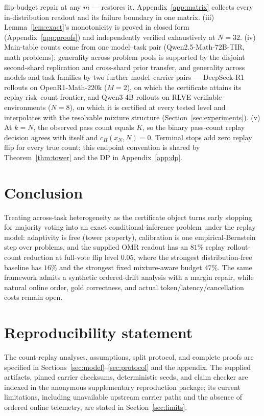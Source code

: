 \documentclass{article}
\theoremstyle{definition}
\theoremstyle{remark}
\newcommand{\cert}{c_H}
\begin{document}
flip-budget repair at any $m$ --- restores it.
Appendix~\ref{app:matrix} collects every in-distribution readout and its
failure boundary in one matrix.
(iii) Lemma~\ref{lem:exact}'s monotonicity is proved in closed form
(Appendix~\ref{app:proofs}) and independently verified exhaustively at
$N=32$.
(iv) Main-table counts come from one model--task pair
(Qwen2.5-Math-72B-TIR, math problems); generality across problem pools is
supported by the disjoint second-shard replication and cross-shard prior
transfer, and generality across models and task families by two further
model--carrier pairs --- DeepSeek-R1 rollouts on OpenR1-Math-220k ($M=2$),
on which the certificate attains its replay risk--count frontier, and
Qwen3-4B rollouts on RLVE verifiable environments ($N=8$), on which it is
certified at every tested level and interpolates with the resolvable mixture
structure (Section~\ref{sec:experiments}).
(v) At $k=N$, the observed pass count equals $K$, so the binary pass-count
replay decision agrees with itself and $\cert(x_N,N)=0$. Terminal stops add
zero replay flip for every true count; this endpoint convention is shared by
Theorem~\ref{thm:tower} and the DP in Appendix~\ref{app:dp}.

\section{Conclusion}
Treating across-task heterogeneity as the certificate object turns early
stopping for majority voting into an exact conditional-inference problem under
the replay model: adaptivity is free (tower property), calibration is one
empirical-Bernstein step over problems, and the supplied OMR readout has an
$81\%$ replay rollout-count reduction at full-vote flip level $0.05$, where
the strongest distribution-free baseline has $16\%$ and the strongest fixed
mixture-aware budget $47\%$. The same framework admits a synthetic
ordered-drift analysis with a margin repair, while natural online order, gold
correctness, and actual token/latency/cancellation costs remain open.

\section*{Reproducibility statement}
The count-replay analyses, assumptions, split protocol, and complete proofs
are specified in Sections~\ref{sec:model}--\ref{sec:protocol} and the
appendix. The supplied artifacts, pinned carrier checksums, deterministic
seeds, and claim checker are indexed in the anonymous supplementary
reproduction package; its current limitations, including unavailable upstream
carrier paths and the absence of ordered online telemetry, are stated in
Section~\ref{sec:limits}.
\end{document}
